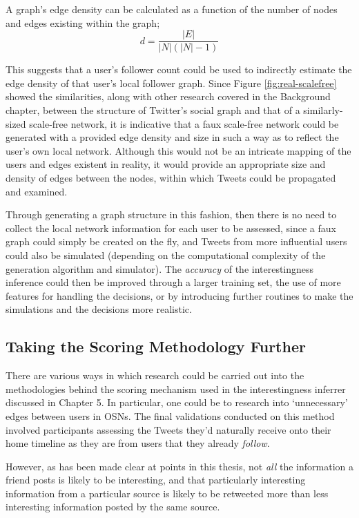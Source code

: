A graph's edge density can be calculated as a function of the number of nodes and edges existing within the graph;
\[
    d = \frac{|E|}{|N|(|N| - 1)}
\]

This suggests that a user's follower count could be used to indirectly estimate the edge density of that user's local follower graph. Since Figure \ref{fig:real-scalefree} showed the similarities, along with other research covered in the Background chapter, between the structure of Twitter's social graph and that of a similarly-sized scale-free network, it is indicative that a faux scale-free network could be generated with a provided edge density and size in such a way as to reflect the user's own local network. Although this would not be an intricate mapping of the users and edges existent in reality, it would provide an appropriate size and density of edges between the nodes, within which Tweets could be propagated and examined.

Through generating a graph structure in this fashion, then there is no need to collect the local network information for each user to be assessed, since a faux graph could simply be created on the fly, and Tweets from more influential users could also be simulated (depending on the computational complexity of the generation algorithm and simulator). The \textit{accuracy} of the interestingness inference could then be improved through a larger training set, the use of more features for handling the decisions, or by introducing further routines to make the simulations and the decisions more realistic. 


\subsection{Taking the Scoring Methodology Further}
There are various ways in which research could be carried out into the methodologies behind the scoring mechanism used in the interestingness inferrer discussed in Chapter 5. In particular, one could be to research into `unnecessary' edges between users in OSNs. The final validations conducted on this method involved participants assessing the Tweets they'd naturally receive onto their home timeline as they are from users that they already \textit{follow}. 

However, as has been made clear at points in this thesis, not \textit{all} the information a friend posts is likely to be interesting, and that particularly interesting information from a particular source is likely to be retweeted more than less interesting information posted by the same source. 

